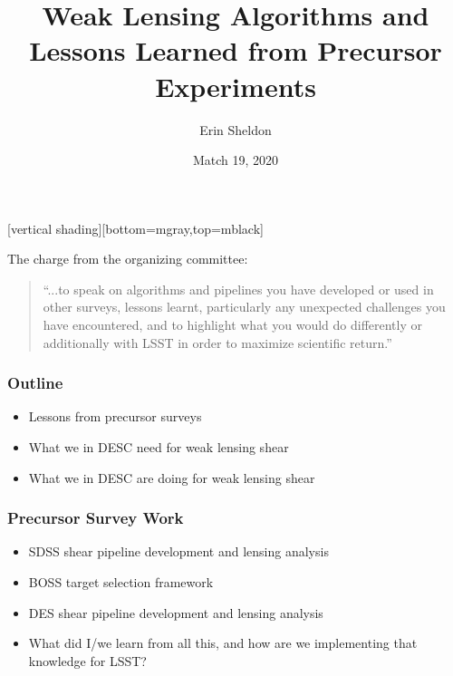 \documentclass{beamer}
\title{Weak Lensing Algorithms and Lessons Learned from Precursor Experiments}
\author{Erin Sheldon}
\institute{Brookhaven National Laboratory}
\date{Match 19, 2020}
\begin{document}
[vertical shading][bottom=mgray,top=mblack]



%
\frame
{


    {\huge The charge from the organizing committee: }
    \newline

    \begin{quote}
    ``...to speak on algorithms and pipelines you have developed or
    used in other surveys, lessons learnt, particularly any unexpected
    challenges you have encountered, and to highlight what you would do
    differently or additionally with LSST in order to maximize scientific
    return.''
    \end{quote}


}

\frame
{

    \frametitle{Outline}


    \begin{itemize}

        \item Lessons from precursor surveys
        \item What we in DESC need for weak lensing shear
        \item What we in DESC are doing for weak lensing shear

    \end{itemize}

}


\frame
{
    \frametitle{Precursor Survey Work}

    \begin{itemize}

        \item SDSS shear pipeline development and lensing analysis

        \item BOSS target selection framework

        \item DES shear pipeline development and lensing analysis

        \item What did I/we learn from all this, and how are we implementing
            that knowledge for LSST?

    \end{itemize}

}
\end{document}
